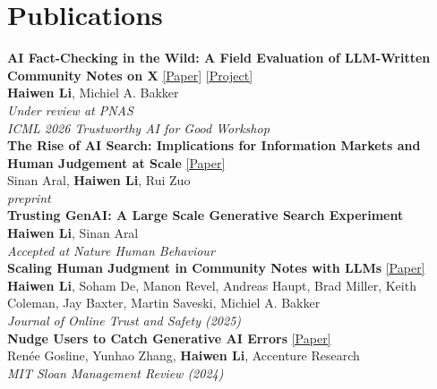 \documentclass[a4paper,11pt]{article}
\begin{document}
\section{\textbf{Publications}}
\vspace{1mm}
\textbf{AI Fact-Checking in the Wild: A Field Evaluation of LLM-Written Community Notes on X} \href{https://arxiv.org/abs/2604.02592}{[Paper]} \href{https://haiwen-li.github.io/ai-fact-checking-in-the-wild/}{[Project]}\\
\hspace{6mm} \textbf{Haiwen Li}, Michiel A. Bakker \\
\hspace{6mm} \textit{Under review at PNAS} \\
\hspace{6mm} \textit{ICML 2026 Trustworthy AI for Good Workshop} \\[1.5mm]
\textbf{The Rise of AI Search: Implications for Information Markets and Human Judgement at Scale} \href{https://arxiv.org/abs/2602.13415}{[Paper]} \\
\hspace{6mm} Sinan Aral, \textbf{Haiwen Li}, Rui Zuo \\
\hspace{6mm} \textit{preprint} \\[1.5mm]
\textbf{Trusting GenAI: A Large Scale Generative Search Experiment} \\
\hspace{6mm} \textbf{Haiwen Li}, Sinan Aral \\
\hspace{6mm} \textit{Accepted at Nature Human Behaviour} \\[1.5mm]
\textbf{Scaling Human Judgment in Community Notes with LLMs} \href{https://tsjournal.org/index.php/jots/article/view/255}{[Paper]} \\
\hspace{6mm} \textbf{Haiwen Li}, Soham De, Manon Revel, Andreas Haupt, Brad Miller, Keith Coleman, Jay Baxter, Martin Saveski, Michiel A. Bakker \\
\hspace{6mm} \textit{Journal of Online Trust and Safety (2025)} \\[1.5mm]
\textbf{Nudge Users to Catch Generative AI Errors} \href{https://sloanreview.mit.edu/article/nudge-users-to-catch-generative-ai-errors/}{[Paper]} \\
\hspace{6mm} Renée Gosline, Yunhao Zhang, \textbf{Haiwen Li}, Accenture Research \\
\hspace*{6mm}\textit{MIT Sloan Management Review (2024)}
\end{document}
